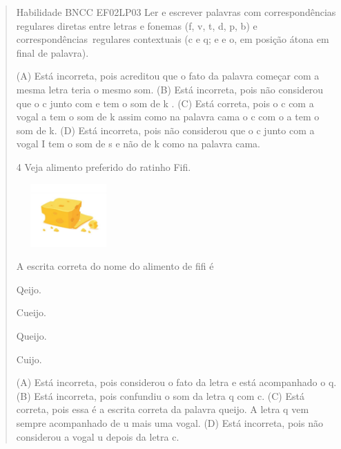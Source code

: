 \begin{verse}
{Habilidade BNCC EF02LP03 Ler e escrever palavras com correspondências
regulares diretas entre letras e fonemas (f, v, t, d, p, b) e
correspondências~regulares contextuais (c e q; e e o, em posição átona
em final de palavra).}

(A) Está incorreta, pois acreditou que o fato da palavra começar com a
mesma letra teria o mesmo som.
(B) Está incorreta, pois não considerou que o c junto com e tem o som de k .
(C) Está correta, pois o c com a vogal a tem o som de k assim como na
palavra cama o c com o a tem o som de k.
(D) Está incorreta, pois não considerou que o c junto com a vogal I tem
o som de s e não de k como na palavra cama.

\num{4} Veja alimento preferido do ratinho Fifi.

\includegraphics[width=1.56736in,height=0.94861in]{media/image141.jpeg}


A escrita correta do nome do alimento de fifi é

\begin{minipage}{.5\textwidth}
\begin{escolha}
\item Qeijo.

\item Cueijo.

\item Queijo.

\item Cuijo.
\end{escolha}
\end{minipage}

(A) Está incorreta, pois considerou o fato da letra e está acompanhado o q.
(B) Está incorreta, pois confundiu o som da letra q com c.
(C) Está correta, pois essa é a escrita correta da palavra queijo. A
letra q vem sempre acompanhado de u mais uma vogal.
(D) Está incorreta, pois não considerou a vogal u depois da letra c.


\end{verse}
